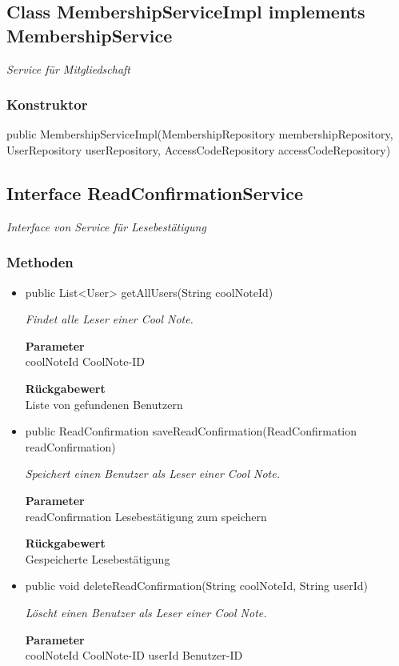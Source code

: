 \documentclass[a4paper]{scrreprt}
\begin{document}
        \subsection{Class MembershipServiceImpl implements MembershipService}
        \textit{Service für Mitgliedschaft}
        \subsubsection{Konstruktor}
        public MembershipServiceImpl(MembershipRepository membershipRepository, UserRepository userRepository, AccessCodeRepository accessCodeRepository)
        \subsection{Interface ReadConfirmationService}
        \textit{Interface von Service für Lesebestätigung}
        \subsubsection{Methoden}
        \begin{itemize}
        	\item{public List<User> getAllUsers(String coolNoteId)}
        	
        	\textit{Findet alle Leser einer Cool Note.}
        	
        	\textbf{Parameter} \\
        	coolNoteId CoolNote-ID
        	
        	\textbf{Rückgabewert} \\
        	Liste von gefundenen Benutzern        \item{public ReadConfirmation saveReadConfirmation(ReadConfirmation readConfirmation)}
        	
        	\textit{Speichert einen Benutzer als Leser einer Cool Note.}
        	
        	\textbf{Parameter} \\
        	readConfirmation Lesebestätigung zum speichern
        	
        	\textbf{Rückgabewert} \\
        	Gespeicherte Lesebestätigung        \item{public void deleteReadConfirmation(String coolNoteId, String userId)}
        	
        	\textit{Löscht einen Benutzer als Leser einer Cool Note.}
        	
        	\textbf{Parameter} \\
        	coolNoteId CoolNote-ID
        	userId Benutzer-ID
        	
        	
        \end{itemize}
\end{document}

